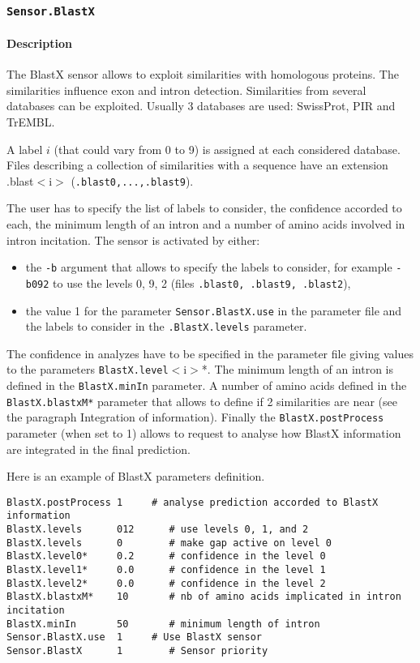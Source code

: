 
\subsubsection{\texttt{Sensor.BlastX}}

\paragraph{Description}

The BlastX sensor allows to exploit similarities with homologous
proteins. The similarities influence exon and intron detection.
Similarities from several databases can be exploited. Usually 3
databases are used: SwissProt, PIR and TrEMBL.

A label $i$ (that could vary from 0 to 9) is assigned at each
considered database. Files describing a collection of similarities with
a sequence have an extension .blast$<$i$>$ (\texttt{.blast0,...,.blast9}).

The user has to specify the list of labels to consider, the
confidence accorded to each, the minimum length of an intron and a
number of amino acids involved in intron incitation.  The sensor is
activated by either:
\begin{itemize}
\item the \texttt{-b} argument 
  that allows to specify the labels to consider, for example
  \texttt{-b092} to use the levels 0, 9, 2 (files \texttt{.blast0,
    .blast9, .blast2}),
\item the value 1 for the parameter \texttt{Sensor.BlastX.use} in
  the parameter file and the labels to consider in the
  \texttt{.BlastX.levels} parameter.
\end{itemize}
The confidence in analyzes have to be specified in the parameter file
giving values to the parameters \texttt{BlastX.level}$<$i$>$*.  The
minimum length of an intron is defined in the \texttt{BlastX.minIn}
parameter.  A number of amino acids defined in the
\texttt{BlastX.blastxM*} parameter that allows to define if 2
similarities are near (see the paragraph Integration of information).
Finally the \texttt{BlastX.postProcess} parameter (when set to 1)
allows to request to analyse how BlastX information are integrated in
the final prediction.

Here is an example of BlastX parameters definition.
\begin{Verbatim}[fontsize=\small]
BlastX.postProcess 1     # analyse prediction accorded to BlastX information
BlastX.levels      012      # use levels 0, 1, and 2
BlastX.levels      0        # make gap active on level 0
BlastX.level0*     0.2      # confidence in the level 0
BlastX.level1*     0.0      # confidence in the level 1
BlastX.level2*     0.0      # confidence in the level 2
BlastX.blastxM*    10       # nb of amino acids implicated in intron incitation
BlastX.minIn       50       # minimum length of intron
Sensor.BlastX.use  1     # Use BlastX sensor
Sensor.BlastX      1        # Sensor priority
\end{Verbatim}

